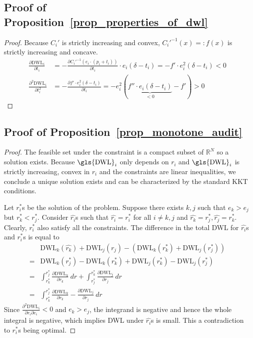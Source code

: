 \subsection{Proof of Proposition~\ref{prop_properties_of_dwl}}
\label{app:proofs-well-operator}
\begin{proof}
Because \(C_i'\) is strictly increasing and convex, \(C_i'^{-1}(x) =: f(x)\) is strictly increasing and concave.
\begin{align*}
\frac{\partial \text{DWL}_i}{\partial t_i} &= - \frac{\partial {C_i'}^{-1}(e_i \cdot (p_i + t_i))}{\partial t_i} \cdot e_i (\delta - t_i) = - f' \cdot e_i^2 (\delta - t_i) < 0\\
\frac{\partial^2 \text{DWL}_i}{\partial t^2_i} &= - \frac{\partial f' \cdot e_i^2 (\delta - t_i)}{\partial t_i} = -e_i^2(\underbrace{f'' \cdot e_i(\delta - t_i)}_{<0} - f') > 0
\end{align*}
\end{proof}


\subsection{Proof of Proposition~\ref{prop_monotone_audit}}
\label{app:audit-policy-proofs-covariates}
\begin{proof}
The feasible set under the constraint is a compact subset of \(\mathbb{R}^N\) so a solution exists.
Because \(\text{\gls{DWL}}_i\) only depends on \(r_i\) and \(\text{\gls{DWL}}_i\) is strictly increasing,
convex in \(r_i\) and the constraints are linear inequalities,
we conclude a unique solution exists and can be characterized by the standard \gls{KKT} conditions.

Let \(r^*_i\)s be the solution of the problem.
Suppose there exists \(k,j\) such that \(e_k > e_j\) but \(r^*_k < r^*_j\).
Consider \(\hat{r_i}\)s such that \(\hat{r_i} = r^*_i\) for all \(i \neq k,j\) and  \(\hat{r_k} = r^*_j, \hat{r_j} = r^*_k\).
Clearly, \(r^*_i\) also satisfy all the constraints.
The difference in the total \gls{DWL} for \(\hat{r_i}\)s and \(r^*_i\)s is equal to
\begin{align*}
&\text{DWL}_k(\hat{r_k}) + \text{DWL}_j(\hat{r_j}) - (\text{DWL}_k(r^*_k) + \text{DWL}_j(r^*_j))\\
= &\text{DWL}_k(r^*_j) - \text{DWL}_k(r^*_k) + \text{DWL}_j(r^*_k) - \text{DWL}_j(r^*_j)\\
= &\int_{r^*_k}^{r^*_j} \frac{\partial \text{DWL}_k}{\partial r_k} \ d r + \int_{r^*_j}^{r^*_k} \frac{\partial \text{DWL}_j}{\partial r_j} \ d r\\
= & \int_{r^*_k}^{r^*_j} \frac{\partial \text{DWL}_k}{\partial r_k} - \frac{\partial \text{DWL}_j}{\partial r_j} \ d r
\end{align*}
Since \(\frac{\partial^2 \text{DWL}_i}{\partial r_i \partial e_i} < 0\) and \(e_k > e_j\), the integrand is negative and hence the whole integral is negative, which implies \gls{DWL} under \(\hat{r_i}\)s is small.
This a contradiction to \(r^*_i\)s being optimal.
\end{proof}

